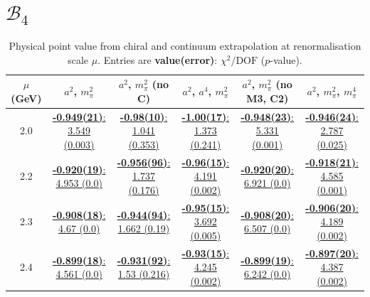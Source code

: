 \documentclass[12pt]{extarticle}
\begin{document}
\section{$\mathcal{B}_4$}
\begin{table}[h!]
\begin{center}
\begin{tabular}{|c|c|c|c|c|c|}
\hline
$\mu$ (GeV) & $a^2$, $m_\pi^2$& $a^2$, $m_\pi^2$ (no C)& $a^2$, $a^4$, $m_\pi^2$& $a^2$, $m_\pi^2$ (no M3, C2)& $a^2$, $m_\pi^2$, $m_\pi^4$\\
\hline
2.0& \hyperlink{SSpPP/NPR/a2m2_20.pdf.1}{\textbf{-0.949(21)}: 3.549 (0.003)} & \hyperlink{SSpPP/NPR/a2m2noC_20.pdf.1}{\textbf{-0.98(10)}: 1.041 (0.353)} & \hyperlink{SSpPP/NPR/a2a4m2_20.pdf.1}{\textbf{-1.00(17)}: 1.373 (0.241)} & \hyperlink{SSpPP/NPR/a2m2mcut_20.pdf.1}{\textbf{-0.948(23)}: 5.331 (0.001)} & \hyperlink{SSpPP/NPR/a2m2m4_20.pdf.1}{\textbf{-0.946(24)}: 2.787 (0.025)}\\
2.2& \hyperlink{SSpPP/NPR/a2m2_22.pdf.1}{\textbf{-0.920(19)}: 4.953 (0.0)} & \hyperlink{SSpPP/NPR/a2m2noC_22.pdf.1}{\textbf{-0.956(96)}: 1.737 (0.176)} & \hyperlink{SSpPP/NPR/a2a4m2_22.pdf.1}{\textbf{-0.96(15)}: 4.191 (0.002)} & \hyperlink{SSpPP/NPR/a2m2mcut_22.pdf.1}{\textbf{-0.920(20)}: 6.921 (0.0)} & \hyperlink{SSpPP/NPR/a2m2m4_22.pdf.1}{\textbf{-0.918(21)}: 4.585 (0.001)}\\
2.3& \hyperlink{SSpPP/NPR/a2m2_23.pdf.1}{\textbf{-0.908(18)}: 4.67 (0.0)} & \hyperlink{SSpPP/NPR/a2m2noC_23.pdf.1}{\textbf{-0.944(94)}: 1.662 (0.19)} & \hyperlink{SSpPP/NPR/a2a4m2_23.pdf.1}{\textbf{-0.95(15)}: 3.692 (0.005)} & \hyperlink{SSpPP/NPR/a2m2mcut_23.pdf.1}{\textbf{-0.908(20)}: 6.507 (0.0)} & \hyperlink{SSpPP/NPR/a2m2m4_23.pdf.1}{\textbf{-0.906(20)}: 4.189 (0.002)}\\
2.4& \hyperlink{SSpPP/NPR/a2m2_24.pdf.1}{\textbf{-0.899(18)}: 4.561 (0.0)} & \hyperlink{SSpPP/NPR/a2m2noC_24.pdf.1}{\textbf{-0.931(92)}: 1.53 (0.216)} & \hyperlink{SSpPP/NPR/a2a4m2_24.pdf.1}{\textbf{-0.93(15)}: 4.245 (0.002)} & \hyperlink{SSpPP/NPR/a2m2mcut_24.pdf.1}{\textbf{-0.899(19)}: 6.242 (0.0)} & \hyperlink{SSpPP/NPR/a2m2m4_24.pdf.1}{\textbf{-0.897(20)}: 4.387 (0.002)}\\
\hline
\end{tabular}
\caption{Physical point value from chiral and continuum extrapolation at renormalisation scale $\mu$. Entries are \textbf{value(error)}: $\chi^2/\text{DOF}$ ($p$-value).}
\end{center}
\end{table}
\end{document}
